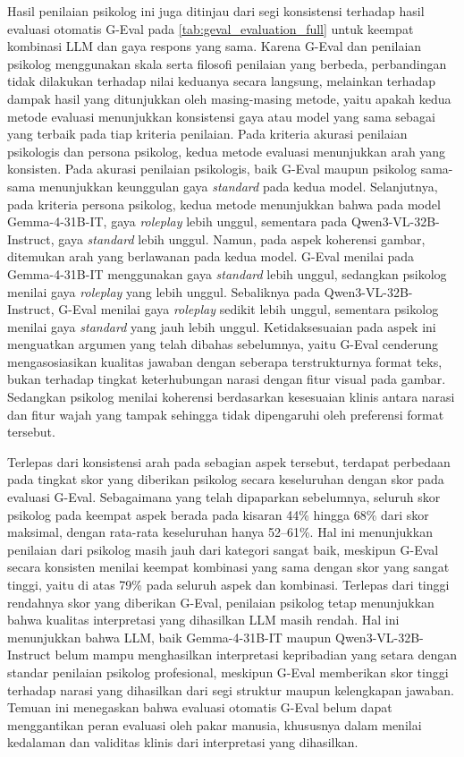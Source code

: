 Hasil penilaian psikolog ini juga ditinjau dari segi konsistensi terhadap hasil evaluasi otomatis G-Eval pada \autoref{tab:geval_evaluation_full} untuk keempat kombinasi LLM dan gaya respons yang sama. Karena G-Eval dan penilaian psikolog menggunakan skala serta filosofi penilaian yang berbeda, perbandingan tidak dilakukan terhadap nilai keduanya secara langsung, melainkan terhadap dampak hasil yang ditunjukkan oleh masing-masing metode, yaitu apakah kedua metode evaluasi menunjukkan konsistensi gaya atau model yang sama sebagai yang terbaik pada tiap kriteria penilaian. Pada kriteria akurasi penilaian psikologis dan persona psikolog, kedua metode evaluasi menunjukkan arah yang konsisten. Pada akurasi penilaian psikologis, baik G-Eval maupun psikolog sama-sama menunjukkan keunggulan gaya \textit{standard} pada kedua model. Selanjutnya, pada kriteria persona psikolog, kedua metode menunjukkan bahwa pada model Gemma-4-31B-IT, gaya \textit{roleplay} lebih unggul, sementara pada Qwen3-VL-32B-Instruct, gaya \textit{standard} lebih unggul. Namun, pada aspek koherensi gambar, ditemukan arah yang berlawanan pada kedua model. G-Eval menilai pada Gemma-4-31B-IT menggunakan gaya \textit{standard} lebih unggul, sedangkan psikolog menilai gaya \textit{roleplay} yang lebih unggul. Sebaliknya pada Qwen3-VL-32B-Instruct, G-Eval menilai gaya \textit{roleplay} sedikit lebih unggul, sementara psikolog menilai gaya \textit{standard} yang jauh lebih unggul. Ketidaksesuaian pada aspek ini menguatkan argumen yang telah dibahas sebelumnya, yaitu G-Eval cenderung mengasosiasikan kualitas jawaban dengan seberapa terstrukturnya format teks, bukan terhadap tingkat keterhubungan narasi dengan fitur visual pada gambar. Sedangkan psikolog menilai koherensi berdasarkan kesesuaian klinis antara narasi dan fitur wajah yang tampak sehingga tidak dipengaruhi oleh preferensi format tersebut.

Terlepas dari konsistensi arah pada sebagian aspek tersebut, terdapat perbedaan pada tingkat skor yang diberikan psikolog secara keseluruhan dengan skor pada evaluasi G-Eval. Sebagaimana yang telah dipaparkan sebelumnya, seluruh skor psikolog pada keempat aspek berada pada kisaran 44\% hingga 68\% dari skor maksimal, dengan rata-rata keseluruhan hanya 52–61\%. Hal ini menunjukkan penilaian dari psikolog masih jauh dari kategori sangat baik, meskipun G-Eval secara konsisten menilai keempat kombinasi yang sama dengan skor yang sangat tinggi, yaitu di atas 79\% pada seluruh aspek dan kombinasi. Terlepas dari tinggi rendahnya skor yang diberikan G-Eval, penilaian psikolog tetap menunjukkan bahwa kualitas interpretasi yang dihasilkan LLM masih rendah. Hal ini menunjukkan bahwa LLM, baik Gemma-4-31B-IT maupun Qwen3-VL-32B-Instruct belum mampu menghasilkan interpretasi kepribadian yang setara dengan standar penilaian psikolog profesional, meskipun G-Eval memberikan skor tinggi terhadap narasi yang dihasilkan dari segi struktur maupun kelengkapan jawaban. Temuan ini menegaskan bahwa evaluasi otomatis G-Eval belum dapat menggantikan peran evaluasi oleh pakar manusia, khususnya dalam menilai kedalaman dan validitas klinis dari interpretasi yang dihasilkan.

